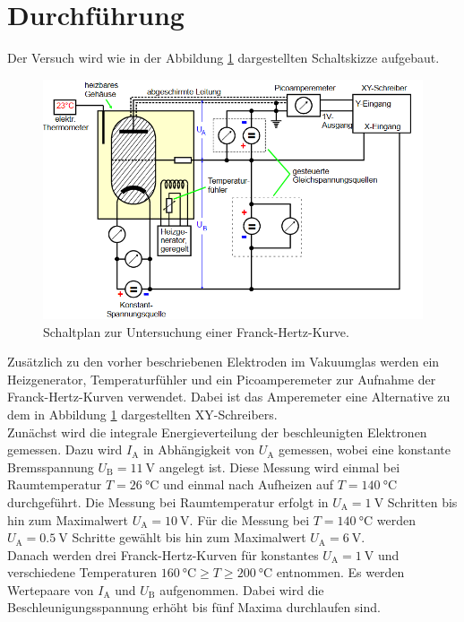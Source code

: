 \section{Durchführung}
\label{sec:Durchführung}
Der Versuch wird wie in der Abbildung \ref{fig:aufd} dargestellten Schaltskizze aufgebaut.
\begin{figure}
    \centering
    \caption{Schaltplan zur Untersuchung einer Franck-Hertz-Kurve.\cite{v601}}
    \label{fig:aufd}
    \includegraphics[width = 0.6 \textwidth]{pics/aufd.png}
\end{figure}
Zusätzlich zu den vorher beschriebenen Elektroden im Vakuumglas werden ein Heizgenerator, Temperaturfühler und ein Picoamperemeter zur Aufnahme der Franck-Hertz-Kurven verwendet.
Dabei ist das Amperemeter eine Alternative zu dem in Abbildung \ref{fig:aufd} dargestellten XY-Schreibers. 
\\
Zunächst wird die integrale Energieverteilung der beschleunigten Elektronen gemessen. Dazu wird 
$I_\text{A}$ in Abhängigkeit von $U_\text{A}$ gemessen, wobei eine konstante Bremsspannung $U_\text{B} = \SI{11}{\volt}$ angelegt ist. Diese Messung wird einmal
bei Raumtemperatur $T= \SI{26}{\celsius}$ und einmal nach Aufheizen auf $T=\SI{140}{\celsius}$ durchgeführt. 
Die Messung bei Raumtemperatur erfolgt in $U_\text{A}=\SI{1}{\volt}$ Schritten bis hin zum Maximalwert $U_\text{A}=\SI{10}{\volt}$.
Für die Messung bei $T=\SI{140}{\celsius}$ werden $U_\text{A}=\SI{0.5}{\volt}$ Schritte gewählt bis hin zum Maximalwert $U_\text{A}=\SI{6}{\volt}$.
\\
Danach werden drei Franck-Hertz-Kurven für konstantes $U_\text{A}=\SI{1}{\volt}$ und verschiedene Temperaturen $\SI{160}{\celsius} \geq T \geq \SI{200}{\celsius}$
entnommen. Es werden Wertepaare von $I_\text{A}$ und $U_\text{B}$ aufgenommen. Dabei wird die Beschleunigungsspannung erhöht bis fünf Maxima durchlaufen sind.